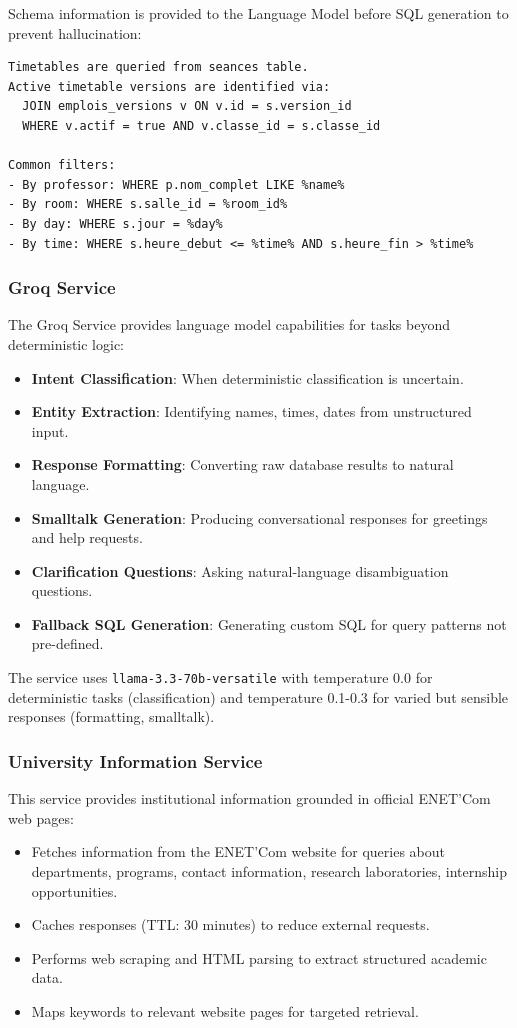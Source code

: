 Schema information is provided to the Language Model before SQL generation to prevent hallucination:

\begin{verbatim}
Timetables are queried from seances table.
Active timetable versions are identified via:
  JOIN emplois_versions v ON v.id = s.version_id
  WHERE v.actif = true AND v.classe_id = s.classe_id

Common filters:
- By professor: WHERE p.nom_complet LIKE %name%
- By room: WHERE s.salle_id = %room_id%
- By day: WHERE s.jour = %day%
- By time: WHERE s.heure_debut <= %time% AND s.heure_fin > %time%
\end{verbatim}

\subsubsection{Groq Service}
The Groq Service provides language model capabilities for tasks beyond deterministic logic:

\begin{itemize}
    \item \textbf{Intent Classification}: When deterministic classification is uncertain.
    \item \textbf{Entity Extraction}: Identifying names, times, dates from unstructured input.
    \item \textbf{Response Formatting}: Converting raw database results to natural language.
    \item \textbf{Smalltalk Generation}: Producing conversational responses for greetings and help requests.
    \item \textbf{Clarification Questions}: Asking natural-language disambiguation questions.
    \item \textbf{Fallback SQL Generation}: Generating custom SQL for query patterns not pre-defined.
\end{itemize}

The service uses \texttt{llama-3.3-70b-versatile} with temperature 0.0 for deterministic tasks (classification) and temperature 0.1-0.3 for varied but sensible responses (formatting, smalltalk).

\subsubsection{University Information Service}
This service provides institutional information grounded in official ENET'Com web pages:

\begin{itemize}
    \item Fetches information from the ENET'Com website for queries about departments, programs, contact information, research laboratories, internship opportunities.
    \item Caches responses (TTL: 30 minutes) to reduce external requests.
    \item Performs web scraping and HTML parsing to extract structured academic data.
    \item Maps keywords to relevant website pages for targeted retrieval.
\end{itemize}

